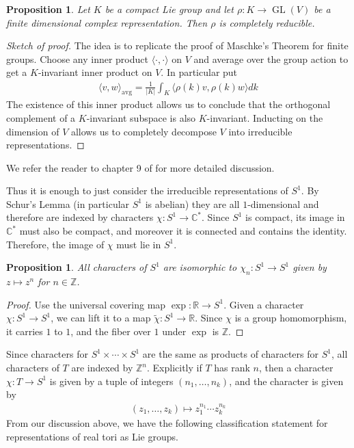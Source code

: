 \documentclass[manuscript, printscheme]{aomart}
\theoremstyle{plain} %
\newtheorem{proposition}[equation]{Proposition}
\theoremstyle{definition}
\theoremstyle{remark}
\DeclareMathOperator{\GL}{GL}
\newcommand{\C}{\mathbb{C}}
\newcommand{\R}{\mathbb{R}}
\newcommand{\Z}{\mathbb{Z}}
\newcommand{\abs}[1]{\lvert #1\vert}
\newcommand{\envert}[1]{\left\lvert#1\right\rvert}
\let\abs=\envert
\begin{document}
\begin{proposition}
	Let $K$ be a compact Lie group and let $\rho:K\to\GL(V)$ be a finite dimensional complex representation.
	Then $\rho$ is completely reducible.
\end{proposition}

\begin{proof}
	[Sketch of proof] The idea is to replicate the proof of Maschke's Theorem for finite groups.
	Choose any inner product $\langle\cdot,\cdot\rangle$ on $V$ and average over the group action to get a $K$-invariant inner product
	on $V$. In particular put \begin{align*}
		\langle v,w\rangle_{\text{avg}} = \frac{1}{\abs{K}}\int_K \langle \rho(k)v,\rho(k)w\rangle dk
	\end{align*}
	The existence of this inner product
	allows us to conclude that the orthogonal complement of a $K$-invariant subspace is also $K$-invariant.
	Inducting on the dimension of $V$ allows us to completely decompose $V$ into irreducible representations.
\end{proof}

We refer the reader to chapter 9 of \cite{fulton-harris} for more detailed discussion.

\hfill

Thus it is enough to just consider the irreducible representations of $S^1$.
By Schur's Lemma (in particular $S^1$ is abelian) they are all $1$-dimensional and
therefore are indexed by characters $\chi: S^1\to \C^*$.
Since $S^1$ is compact, its image in $\C^*$ must also be compact, and moreover
it is connected and contains the identity. Therefore, the image of $\chi$ must lie in $S^1$.


\begin{proposition}
	All characters of $S^1$ are isomorphic to $\chi_n: S^1\to S^1$ given by $z\mapsto z^n$ for $n\in \Z$.
\end{proposition}

\begin{proof}
	Use the universal covering map $\exp: \R\to S^1$.
	Given a character $\chi: S^1\to S^1$, we can lift it to a map $\tilde \chi: S^1\to \R$.
	Since $\chi$ is a group homomorphism, it carries $1$ to $1$, and the fiber over $1$ under $\exp$ is $\Z$.
\end{proof}

Since characters for $S^1\times\cdots\times S^1$ are the same as products of characters for $S^1$,
all characters of $T$ are indexed by $\Z^n$. Explicitly if $T$ has rank $n$, then a character $\chi: T\to S^1$ is given by a tuple of integers $(n_1,\ldots, n_k)$, and the character is given by
\begin{align*}
	(z_1,\ldots, z_k)\mapsto z_1^{n_1}\cdots z_k^{n_k}
\end{align*}
From our discussion above, we have the following classification statement for representations of real tori as Lie groups.
\end{document}
